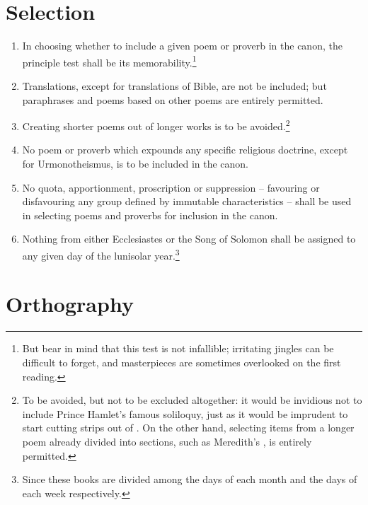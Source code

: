 \section{Selection}

\begin{enumerate}[leftmargin=*, resume]
    \item{In choosing whether to include a given poem or proverb in the canon, the principle test shall be its memorability.\footnote{But bear in mind that this test is not infallible; irritating jingles can be difficult to forget, and masterpieces are sometimes overlooked on the first reading.}}
    \item{Translations, except for translations of Bible, are not be included; but paraphrases and poems based on other poems are entirely permitted.}
    \item{Creating shorter poems out of longer works is to be avoided.\footnote{To be avoided, but not to be excluded altogether: it would be invidious not to include Prince Hamlet's famous soliloquy, just as it would be imprudent to start cutting strips out of . On the other hand, selecting items from a longer poem already divided into sections, such as Meredith's , is entirely permitted.}}
    \item{No poem or proverb which expounds any specific religious doctrine, except for Urmonotheismus, is to be included in the canon.}
    \item{No quota, apportionment, proscription or suppression -- favouring or disfavouring any group defined by immutable characteristics -- shall be used in selecting poems and proverbs for inclusion in the canon.}
    \item{Nothing from either Ecclesiastes or the Song of Solomon shall be assigned to any given day of the lunisolar year.\footnote{Since these books are divided among the days of each month and the days of each week respectively.}}
\end{enumerate}

\section{Orthography}

